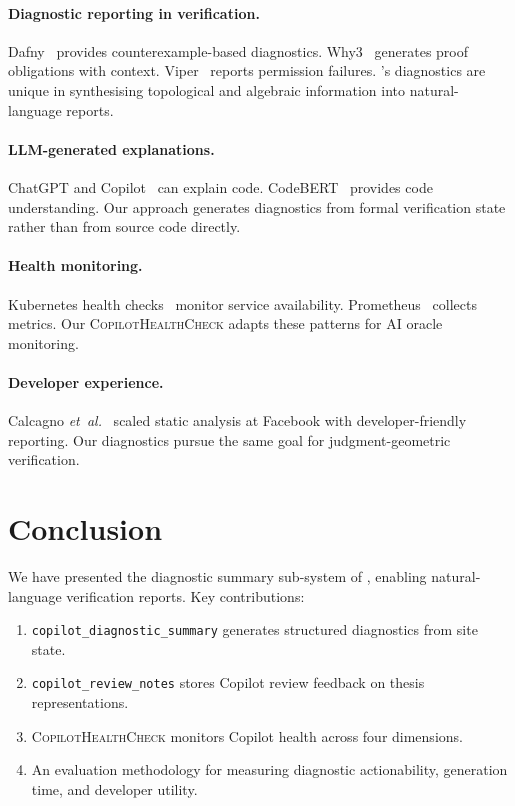 \documentclass[11pt]{article}
\newcommand{\DiagSum}{\texttt{copilot\_diagnostic\_summary}}
\newcommand{\CopRevNotes}{\texttt{copilot\_review\_notes}}
\newcommand{\HealthChk}{\textsc{CopilotHealthCheck}}
\begin{document}
\paragraph{Diagnostic reporting in verification.}
Dafny~\cite{leino2010dafny} provides counterexample-based diagnostics.
Why3~\cite{filliatre2013why3} generates proof obligations with context.
Viper~\cite{muller2016viper} reports permission failures.  \JuGeo{}'s
diagnostics are unique in synthesising topological and algebraic information
into natural-language reports.

\paragraph{LLM-generated explanations.}
ChatGPT and Copilot~\cite{chen2021evaluating} can explain code.
CodeBERT~\cite{feng2020codebert} provides code understanding.  Our approach
generates diagnostics from formal verification state rather than from source
code directly.

\paragraph{Health monitoring.}
Kubernetes health checks~\cite{burns2016borg} monitor service availability.
Prometheus~\cite{prometheus2012} collects metrics.  Our \HealthChk{} adapts
these patterns for AI oracle monitoring.

\paragraph{Developer experience.}
Calcagno \emph{et~al.}~\cite{distefano2019scaling} scaled static analysis at
Facebook with developer-friendly reporting.  Our diagnostics pursue the same
goal for judgment-geometric verification.

\section{Conclusion}\label{sec:conclusion}

We have presented the diagnostic summary sub-system of \JuGeo{}, enabling
natural-language verification reports.  Key contributions:

\begin{enumerate}[leftmargin=2em]
  \item \DiagSum{} generates structured diagnostics from site state.
  \item \CopRevNotes{} stores Copilot review feedback on thesis representations.
  \item \HealthChk{} monitors Copilot health across four dimensions.
  \item An evaluation methodology for measuring diagnostic actionability,
        generation time, and developer utility.
\end{enumerate}
\end{document}
